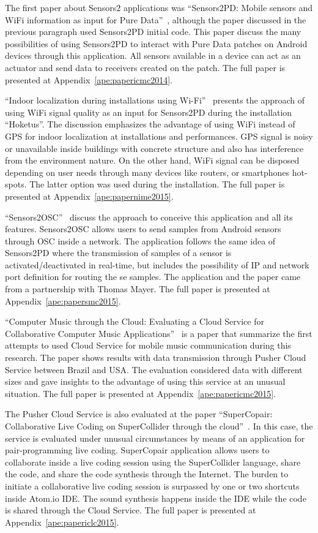 The first paper about Sensors2 applications was ``Sensors2PD: Mobile sensors and WiFi information as input for Pure Data''~\citep{deCarvalhoJunior2014sensors2pd},
although the paper discussed in the previous paragraph used Sensors2PD initial code.
This paper discuss the many possibilities of using Sensors2PD to interact with Pure Data patches on Android devices through this application.
All sensors available in a device can act as an actuator and send data to receivers created on the patch.
The full paper is presented at Appendix~\ref{ape:papericmc2014}.

``Indoor localization during installations using Wi-Fi''~\citep{deCarvalhoJunior2015indoor} presents the approach of using WiFi signal quality as an input for Sensors2PD during the installation ``Hoketus''.
The discussion emphasizes the advantage of using WiFi instead of GPS for indoor localization at installations and performances.
GPS signal is noisy or unavailable inside buildings with concrete structure and also has interference from the environment nature.
On the other hand, WiFi signal can be disposed depending on user needs through many devices like routers, or smartphones hot-spots. 
The latter option was used during the installation.
The full paper is presented at Appendix~\ref{ape:papernime2015}.

``Sensors2OSC''~\citep{deCarvalhoJunior2015sensors2osc} discuss the approach to conceive this application and all its features.
Sensors2OSC allows users to send samples from Android sensors through OSC inside a network.
The application follows the same idea of Sensors2PD where the transmission of samples of a sensor is activated/deactivated in real-time, but includes the possibility of IP and network port definition for routing the se samples.
The application and the paper came from a partnership with Thomas Mayer.
The full paper is presented at Appendix~\ref{ape:papersmc2015}.


``Computer Music through the Cloud: Evaluating a Cloud Service for Collaborative Computer Music Applications''~\citep{deCarvalhoJunior2015computer} is a paper that summarize the first attempts to used Cloud Service for mobile music communication during this research.
The paper shows results with data transmission through Pusher Cloud Service between Brazil and USA.
The evaluation considered data with different sizes and gave insights to the advantage of using this service at an unusual situation.
The full paper is presented at Appendix~\ref{ape:papericmc2015}.

The Pusher Cloud Service is also evaluated at the paper ``SuperCopair: Collaborative Live Coding on SuperCollider through the cloud''~\citep{deCarvalhoJunior2015supercopair}.
In this case, the service is evaluated under unusual circumstances by means of an application for pair-programming live coding.
SuperCopair application allows users to collaborate inside a live coding session using the SuperCollider language, share the code, and share the code synthesis through the Internet.
The burden to initiate a collaborative live coding session is surpassed by one or two shortcuts inside Atom.io IDE.
The sound synthesis happens inside the IDE while the code is shared through the Cloud Service.
The full paper is presented at Appendix~\ref{ape:papericlc2015}.

